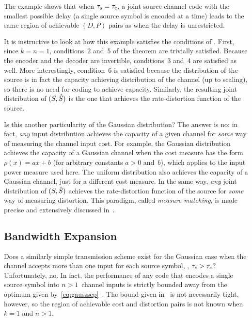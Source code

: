 The example shows that when ${\tau_s} = {\tau_c}$, a joint source-channel code with the
smallest possible delay (a single source symbol is encoded at a time) leads to
the same region of achievable $(D,P)$ pairs as when the delay is unrestricted.

It is instructive to look at how this example satisfies the conditions of
. First, since $k = n = 1$, conditions~2 and~5 of
the theorem are trivially satisfied. Because the encoder and the decoder are
invertible, conditions~3 and~4 are satisfied as well. More interestingly,
condition~6 is satisfied because the distribution of the source is in fact the
capacity achieving distribution of the channel (up to scaling), so there is no
need for coding to achieve capacity. Similarly, the resulting joint distribution
of $(S, {\hat{S}})$ is the one that achieves the rate-distortion function of the
source.

Is this another particularity of the Gaussian distribution? The answer is no: in
fact, \emph{any} input distribution achieves the capacity of a given channel for
\emph{some} way of measuring the channel input cost. For example, the Gaussian
distribution achieves the capacity of a Gaussian channel when the cost
measure has the form $\rho(x) = ax + b$ (for arbitrary constants $a > 0$
and~$b$), which applies to the input power measure used here. The uniform
distribution also achieves the capacity of a Gaussian channel, just for a
different cost measure. In the same way, \emph{any} joint distribution of $(S,
{\hat{S}})$ achieves the rate-distortion function of the source for \emph{some} way of
measuring distortion. This paradigm, called \emph{measure matching}, is made
precise and extensively discussed in~\cite{GastparRV2003}.


\subsection{Bandwidth Expansion}\label{sec:gaussbwex}

Does a similarly simple transmission scheme exist for the Gaussian case when the
channel accepts more than one input for each source symbol, \ie, ${\tau_c} > {\tau_s}$?
Unfortunately, no. In fact, the performance of any code that encodes a single
source symbol into $n>1$~channel inputs is strictly bounded away from the
optimum given by~\eqref{eq:gausssep}~\cite{IngberLZF2008}.  The bound given
in~\cite{IngberLZF2008} is not necessarily tight, however, so the region of
achievable cost and distortion pairs is not known when $k = 1$ and $n > 1$. 

